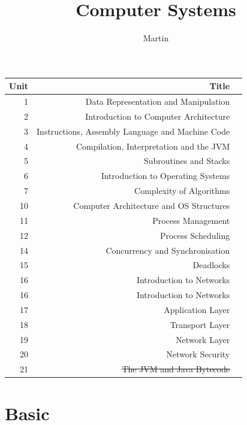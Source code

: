 \documentclass[
  11pt,
  a4paper,
]{book}
\title{Computer Systems}
\author{Martin}
\date{}
\begin{document}

\maketitle

\vspace*{\fill}

\begin{table}[htp]
  \centering
  \begin{tabular}{rrl}
    \toprule
    Unit & Title \\
    \midrule
       1 & Data Representation and Manipulation \\[1ex]
       2 & Introduction to Computer Architecture \\
       3 & Instructions, Assembly Language and Machine Code \\[1ex]
       4 & Compilation, Interpretation and the JVM \\
       5 & Subroutines and Stacks \\[1ex]
       6 & Introduction to Operating Systems \\
       7 & Complexity of Algorithms \\[1ex]
       10 & Computer Architecture and OS Structures \\[1ex]
       11 & Process Management \\
       12 & Process Scheduling \\[1ex]
       14 & Concurrency and Synchronisation \\[1ex]
       15 & Deadlocks \\
       16 & Introduction to Networks \\[1ex]
       16 & Introduction to Networks \\
       17 & Application Layer \\
       18 & Transport Layer \\[1ex]
       19 & Network Layer \\
       20 & Network Security \\
       21 & \sout{The JVM and Java Bytecode} \\
    \bottomrule
  \end{tabular}
\end{table}
\vspace*{\fill}
\addvspace{1in}

\clearpage


\chapter{Basic}
\end{document}
